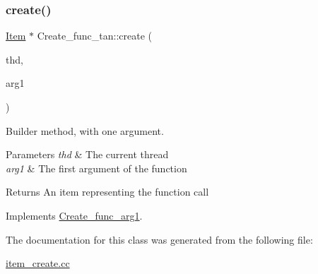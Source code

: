 \subsubsection{\texorpdfstring{create()}{create()}}
{\footnotesize\ttfamily \mbox{\hyperlink{classItem}{Item}} $\ast$ Create\+\_\+func\+\_\+tan\+::create (\begin{DoxyParamCaption}\item[{T\+HD $\ast$}]{thd,  }\item[{\mbox{\hyperlink{classItem}{Item}} $\ast$}]{arg1 }\end{DoxyParamCaption})\hspace{0.3cm}{\ttfamily [virtual]}}

Builder method, with one argument. 
\begin{DoxyParams}{Parameters}
{\em thd} & The current thread \\
\hline
{\em arg1} & The first argument of the function \\
\hline
\end{DoxyParams}
\begin{DoxyReturn}{Returns}
An item representing the function call 
\end{DoxyReturn}


Implements \mbox{\hyperlink{classCreate__func__arg1_a3e9a98f755cd82c3e762e334c955a8c9}{Create\+\_\+func\+\_\+arg1}}.



The documentation for this class was generated from the following file\+:\begin{DoxyCompactItemize}
\item 
\mbox{\hyperlink{item__create_8cc}{item\+\_\+create.\+cc}}\end{DoxyCompactItemize}
